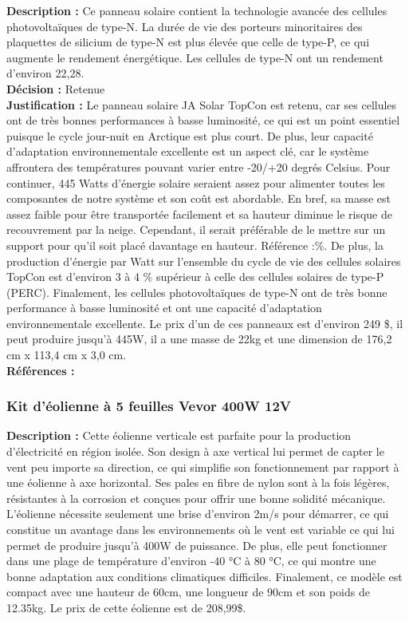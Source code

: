 \noindent
\textbf{Description :} Ce panneau solaire contient la technologie avancée des cellules
photovoltaïques de type-N. La durée de vie des porteurs minoritaires des
plaquettes de silicium de type-N est plus élevée que celle de type-P, ce qui
augmente le rendement énergétique. Les cellules de type-N ont un rendement
d’environ 22,28. \\

\noindent
\textbf{Décision :} Retenue \\

\noindent
\textbf{Justification :} Le panneau solaire JA Solar
TopCon est retenu, car ses cellules ont de très bonnes performances à basse
luminosité, ce qui est un point essentiel puisque le cycle jour-nuit en
Arctique est plus court. De plus, leur capacité d’adaptation environnementale
excellente est un aspect clé, car le système affrontera des températures
pouvant varier entre -20/+20 degrés Celsius. Pour continuer, 445 Watts
d’énergie solaire seraient assez pour alimenter toutes les composantes de notre
système et son coût est abordable. En bref, sa masse est assez faible pour être
transportée facilement et sa hauteur diminue le risque de recouvrement par la
neige. Cependant, il serait préférable de le mettre sur un support pour qu’il
soit placé davantage en hauteur. Référence :\%. De plus, la production
d’énergie par Watt sur l’ensemble du cycle de vie des cellules solaires TopCon
est d’environ 3 à 4 \% supérieur à celle des cellules solaires de type-P (PERC).
Finalement, les cellules photovoltaïques de type-N ont de très bonne performance à basse luminosité et ont une capacité d’adaptation environnementale excellente. Le prix d’un de ces panneaux est d’environ 249 \$, il peut produire jusqu’à 445W, il a une masse de 22kg et une dimension de 176,2 cm x 113,4 cm x 3,0 cm. \\

\noindent
\textbf{Références :} \cite{8} \cite{9} \cite{10} \\

\subsubsection{Kit d'éolienne à 5 feuilles Vevor 400W 12V}

\noindent
\textbf{Description :} Cette éolienne verticale est parfaite pour la production
d’électricité en région isolée. Son design à axe vertical lui permet de capter
le vent peu importe sa direction, ce qui simplifie son fonctionnement par
rapport à une éolienne à axe horizontal. Ses pales en fibre de nylon sont à la
fois légères, résistantes à la corrosion et conçues pour offrir une bonne
solidité mécanique. L’éolienne nécessite seulement une brise d’environ 2m/s
pour démarrer, ce qui constitue un avantage dans les environnements où le vent
est variable ce qui lui permet de produire jusqu’à 400W de puissance. De plus,
elle peut fonctionner dans une plage de température d’environ -40 °C à 80 °C,
ce qui montre une bonne adaptation aux conditions climatiques difficiles.
Finalement, ce modèle est compact avec une hauteur de 60cm, une longueur de
90cm et son poids de 12.35kg. Le prix de cette éolienne est de 208,99\$. \\

